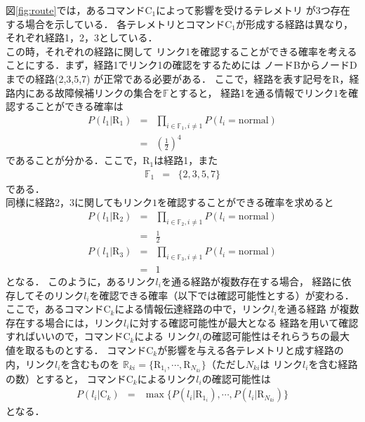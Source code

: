 \documentclass[11pt]{jsreport}
\begin{document}
図\ref{fig:route}では，あるコマンドC$_1$によって影響を受けるテレメトリ
が3つ存在する場合を示している．
各テレメトリとコマンドC$_1$が形成する経路は異なり，それぞれ経路1，2，3としている．\\
この時，それぞれの経路に関して
リンク1を確認することができる確率を考えることにする．まず，経路1でリンク1の確認をするためには
ノードBからノードDまでの経路(2,3,5,7)
が正常である必要がある．%
ここで，経路を表す記号をR，経路内にある故障候補リンクの集合を$\mathbb{F}$とすると，
経路1を通る情報でリンク$1$を確認することができる確率は
\begin{eqnarray}
   P(l_{1} | \text{R}_1) &=& \prod_{i\in\mathbb{F}_1,i\neq 1} P(l_{i} = \text{normal})\\
     &=& \left( \frac{1}{2}\right)^4
\end{eqnarray}
であることが分かる．ここで，R$_1$は経路1，また
\begin{eqnarray}
   \mathbb{F}_1  &=& \{ 2,3,5,7\} 
\end{eqnarray}
である．\\
同様に経路2，3に関してもリンク$1$を確認することができる確率を求めると
\begin{eqnarray}
   P(l_{1} | \text{R}_2)  &=& \prod_{i\in\mathbb{F}_2,i\neq 1} P(l_{i} = \text{normal})\\
   &=& \frac{1}{2}\\
   P(l_{1} | \text{R}_3)  &=& \prod_{i\in\mathbb{F}_3,i\neq 1} P(l_{i} = \text{normal})\\
   &=& 1
\end{eqnarray}
となる．
このように，あるリンク$l_i$を通る経路が複数存在する場合，
経路に依存してそのリンク$l_i$を確認できる確率（以下では確認可能性とする）が変わる．
ここで，あるコマンドC$_k$による情報伝達経路の中で，リンク$l_i$を通る経路
が複数存在する場合には，リンク$l_i$に対する確認可能性が最大となる
経路を用いて確認すればいいので，コマンドC$_k$による
リンク$l_i$の確認可能性はそれらうちの最大値を取るものとする．
コマンドC$_k$が影響を与える各テレメトリと成す経路の内，リンク$l_i$を含むものを
$\mathbb{R}_{ki} = \{ \text{R}_{1_i}, \cdots ,\text{R}_{N_{ki}} \}$（ただし$N_{ki}$は
リンク$l_i$を含む経路の数）とすると，
コマンドC$_k$によるリンク$l_i$の確認可能性は
\begin{eqnarray}
   P(l_i|\text{C}_k) &=& \max  \{ P(l_i|\text{R}_{1_i}), \cdots ,P(l_i|\text{R}_{N_{ki}}) \}
   \label{eq:P li Ck}
\end{eqnarray}
となる．\\
\end{document}
